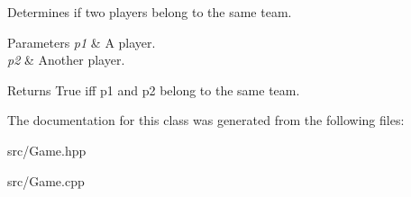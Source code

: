 Determines if two players belong to the same team. 


\begin{DoxyParams}{Parameters}
{\em p1} & A player. \\
\hline
{\em p2} & Another player. \\
\hline
\end{DoxyParams}
\begin{DoxyReturn}{Returns}
True iff p1 and p2 belong to the same team. 
\end{DoxyReturn}


The documentation for this class was generated from the following files\-:\begin{DoxyCompactItemize}
\item 
src/Game.\-hpp\item 
src/Game.\-cpp\end{DoxyCompactItemize}
